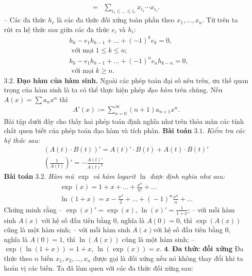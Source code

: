 \begin{multicols}{2}
\begin{align*}
		=&\sum_{i_1\leq\ldots\leq i_r}x_{i_1}\cdots x_{i_r}. \tag{$7$}
	\end{align*} 
	-- Các đa thức  $h_r$ là các {\color{blue} đa thức đối xứng toàn phần} theo  $x_1,\ldots, x_n$. 
	Từ trên ta rút ra hệ thức sau giữa các đa thức $e_i$ và $h_i$:
	\begin{align*}
		&h_k-e_1h_{k-1}+\ldots+(-1)^ke_k=0,\\
		&\text{ với mọi }   1\leq k\leq n;\\
		&h_k-e_1h_{k-1}+\ldots+(-1)^ne_n h_{k-n}=0,\\
		&\text{ với mọi }    k\geq n.
	\end{align*}
	$\pmb{3.2.}$ \textbf{\color{hoccungpi}Đạo hàm của hàm sinh.}
	Ngoài các phép toán đại số nêu trên, ưu thế quan trọng của hàm sinh là ta có thể thực hiện phép {\em đạo hàm} trên chúng. 
	\vskip 0.1cm
	Nếu $A(x)=\sum a_nx^n$ thì 
	\begin{align*}
		A'(x):=\sum_{n=0}^\infty  (n+1)a_{n+1}x^n.
	\end{align*} 
	Bài tập dưới đây cho thấy hai phép toán định nghĩa như trên thỏa mãn các tính chất quen biết của phép toán đạo hàm và tích phân.
	\vskip 0.1cm
	\textbf{\color{hoccungpi}Bài toán} $\pmb{3.1.}$\textit{ Kiểm tra các hệ thức sau:}
		\begin{align*}
			(A(t)\cdot B(t))'=A(t)'\cdot B(t)+A(t)\cdot B(t)'\\
			\left(\frac 1{A(t)}\right)'=-\frac{A(t)'}{A(t)^2}		
		\end{align*}
	\textbf{\color{hoccungpi}Bài toán} $\pmb{3.2.}$ \textit{Hàm mũ $\exp$ và hàm logarit $\ln$ được định nghĩa như sau:}
	\begin{align*}
		\exp(x)=1+x+\ldots+\frac{x^n}{n!}+\ldots \tag{$8$}\\
		\ln(1\!+\!x)\!=\!x\!-\!\frac{x^2}2\!+\!\ldots\!+\!(\!-\!1)^n\frac{x^n}n\!+\!\ldots\! \tag{$9$}
	\end{align*}
	Chứng minh rằng
	\vskip 0.1cm
	-- $\exp(x)'=\exp(x)$, $\ln(x)'=\frac1{1+x}$;
	\vskip 0.1cm
	-- với mỗi hàm sinh $A(x)$ với hệ số đầu tiên bằng 0, nghĩa là $A(0)=0$, thì $\exp(A(x))$ cũng là một hàm sinh;
	\vskip 0.1cm
	-- với mỗi hàm sinh $A(x)$với hệ số đầu tiên bằng 0, nghĩa là $A(0)=1$, thì $\ln(A(x))$ cũng là một hàm sinh;
	\vskip 0.1cm
	-- $\exp(\ln(1+x))=1+x$, $\ln(\exp(x))=x$.
	\vskip 0.1cm
	$\pmb{4.}$ \textbf{\color{hoccungpi}Đa thức đối xứng} 
	\vskip 0.1cm
	Đa thức theo $n$ biến $x_1,x_2,\ldots,x_n$ được gọi là đối xứng nếu nó không thay đổi khi ta hoán vị các biến. Ta đã làm quen với các đa thức đối xứng sau: 
	\vskip 0.1cm

\end{multicols}
